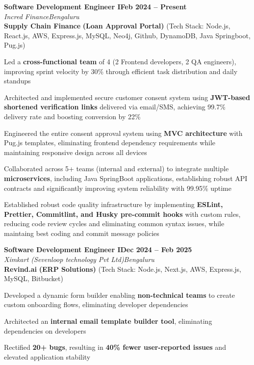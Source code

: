 \documentclass[letterpaper, 10pt]{article}
\newcommand{\heading}[2]{ \hspace{5pt}#1\hfill#2\\[1pt] }
\newcommand{\headingBf}[2]{ \heading{\textbf{#1}}{\textbf{#2}} }
\newcommand{\headingIt}[2]{ \heading{\textit{#1}}{\textit{#2}} }
\newenvironment{resume_list}{
\vspace{-3pt}
\begin{itemize}[itemsep=0.5pt, parsep=0.5pt, leftmargin=18pt] }{ \end{itemize}
\vspace{-3pt}
}
\begin{document}
\headingBf{Software Development Engineer I}{Feb 2024 -- Present}
\headingIt{Incred Finance}{Bengaluru}
\vspace{5pt}
\hspace{10pt}\textbf{Supply Chain Finance} \textbf{(Loan Approval Portal)} \small{(Tech Stack: Node.js, React.js, AWS, Express.js, MySQL, Neo4j, Github, DynamoDB, Java Springboot, Pug.js)}
\begin{resume_list}
    \item Led a \textbf{cross-functional team} of 4 (2 Frontend developers, 2 QA engineers), improving sprint velocity by 30\% through efficient task distribution and daily standups
    \item Architected and implemented secure customer consent system using \textbf{JWT-based shortened verification links} delivered via email/SMS, achieving 99.7\% delivery rate and boosting conversion by 22\%
    \item Engineered the entire consent approval system using \textbf{MVC architecture} with Pug.js templates, eliminating frontend dependency requirements while maintaining responsive design across all devices
    \item Collaborated across 5+ teams (internal and external) to integrate multiple \textbf{microservices}, including Java SpringBoot applications, establishing robust API contracts and significantly improving system reliability with 99.95\% uptime
    \item Established robust code quality infrastructure by implementing \textbf{ESLint, Prettier, Commitlint, and Husky pre-commit hooks} with custom rules, reducing code review cycles and eliminating common syntax issues, while maintaing best coding and commit message policies
\end{resume_list}

\vspace{6pt}

\headingBf{Software Development Engineer I}{Dec 2024 -- Feb 2025}
\headingIt{Ximkart (Sevenloop technology Pvt Ltd)}{Bengaluru}
\vspace{5pt}
\hspace{10pt}\textbf{Revind.ai} \textbf{(ERP Solutions)} \small{(Tech Stack: Node.js, Next.js, AWS, Express.js, MySQL, Bitbucket)}
\begin{resume_list}
    \item Developed a dynamic form builder enabling \textbf{non-technical teams} to create custom onboarding flows, eliminating developer dependencies
    \item Architected an \textbf{internal email template builder tool}, eliminating dependencies on developers
    \item Rectified \textbf{20+ bugs}, resulting in \textbf{40\% fewer user-reported issues} and elevated application stability
\end{resume_list}
\end{document}
